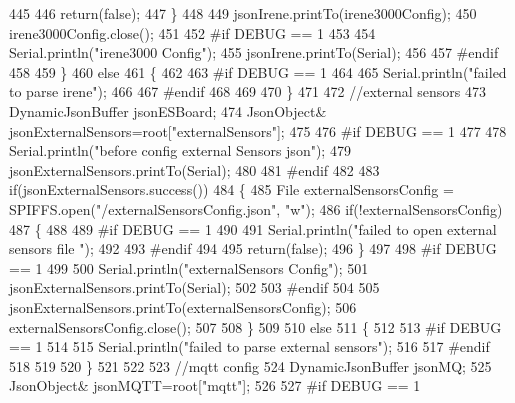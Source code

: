 \begin{DoxyCode}
445 
446             \textcolor{keywordflow}{return}(\textcolor{keyword}{false});
447         \}
448 
449         jsonIrene.printTo(irene3000Config);
450         irene3000Config.close();
451     
452 \textcolor{preprocessor}{    #if DEBUG == 1 }
453         
454         Serial.println(\textcolor{stringliteral}{"irene3000 Config"});
455         jsonIrene.printTo(Serial);
456     
457 \textcolor{preprocessor}{    #endif}
458     
459     \}
460     \textcolor{keywordflow}{else}
461     \{
462     
463 \textcolor{preprocessor}{    #if DEBUG == 1 }
464 
465         Serial.println(\textcolor{stringliteral}{"failed to parse irene"});    
466     
467 \textcolor{preprocessor}{    #endif }
468 
469 
470     \}
471     
472     \textcolor{comment}{//external sensors}
473     DynamicJsonBuffer jsonESBoard;
474         JsonObject& jsonExternalSensors=root[\textcolor{stringliteral}{"externalSensors"}];
475 
476 \textcolor{preprocessor}{#if DEBUG == 1 }
477 
478     Serial.println(\textcolor{stringliteral}{"before config external Sensors json"});
479     jsonExternalSensors.printTo(Serial);
480 
481 \textcolor{preprocessor}{#endif}
482 
483     \textcolor{keywordflow}{if}(jsonExternalSensors.success())
484     \{
485         File externalSensorsConfig = SPIFFS.open(\textcolor{stringliteral}{"/externalSensorsConfig.json"}, \textcolor{stringliteral}{"w"});   
486         \textcolor{keywordflow}{if}(!externalSensorsConfig)
487         \{
488         
489 \textcolor{preprocessor}{        #if DEBUG == 1 }
490 
491             Serial.println(\textcolor{stringliteral}{"failed to open external sensors file "});
492         
493 \textcolor{preprocessor}{        #endif }
494 
495             \textcolor{keywordflow}{return}(\textcolor{keyword}{false});
496         \}
497 
498 \textcolor{preprocessor}{#if DEBUG == 1 }
499         
500         Serial.println(\textcolor{stringliteral}{"externalSensors Config"});
501         jsonExternalSensors.printTo(Serial);
502 
503 \textcolor{preprocessor}{#endif }
504 
505         jsonExternalSensors.printTo(externalSensorsConfig); 
506         externalSensorsConfig.close();
507 
508     \}
509 
510     \textcolor{keywordflow}{else}
511     \{   
512 
513 \textcolor{preprocessor}{    #if DEBUG == 1}
514         
515         Serial.println(\textcolor{stringliteral}{"failed to parse external sensors"});
516 
517 \textcolor{preprocessor}{    #endif}
518 
519 
520     \}
521 
522     
523     \textcolor{comment}{//mqtt config}
524     DynamicJsonBuffer jsonMQ;
525         JsonObject& jsonMQTT=root[\textcolor{stringliteral}{"mqtt"}];
526     
527 \textcolor{preprocessor}{#if DEBUG == 1 }

\end{DoxyCode}
